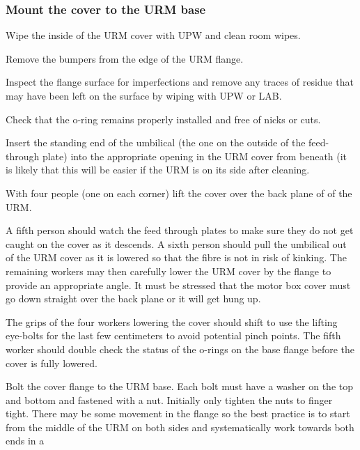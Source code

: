 \documentclass[11pt]{article}
\begin{document}
\subsubsection{Mount the cover to the URM base}
\begin{answerlist}
\item Wipe the inside of the URM cover with UPW and clean room wipes.
\item Remove the bumpers from the edge of the URM flange.
\item Inspect the flange surface for imperfections and remove any
  traces of residue that may have been left on the surface by wiping
  with UPW or LAB.
\item Check that the o-ring remains properly installed and free of
  nicks or cuts.
\item Insert the standing end of the umbilical (the one on the outside of the feed-through plate) into the appropriate opening in the URM cover from beneath (it is likely that this will be easier if the URM is on its side after cleaning. 
\item With four people (one on each corner) lift the cover over the
  back plane of of the URM.
\item A fifth person should watch the feed through plates to make sure
  they do not get caught on the cover as it descends. A sixth person
  should pull the umbilical out of the URM cover as it is lowered so
  that the fibre is not in risk of kinking. The remaining workers may
  then carefully lower the URM cover by the flange to provide an
  appropriate angle. It must be stressed that the motor box cover must
  go down straight over the back plane or it will get hung up.
\item The grips of the four workers lowering the cover should shift to
  use the lifting eye-bolts for the last few centimeters to avoid
  potential pinch points. The fifth worker should double check the
  status of the o-rings on the base flange before the cover is fully
  lowered.
\item Bolt the cover flange to the URM base. Each bolt must have a
  washer on the top and bottom and fastened with a nut. Initially only
  tighten the nuts to finger tight. There may be some movement in the
  flange so the best practice is to start from the middle of the URM
  on both sides and systematically work towards both ends in a

\end{answerlist}
\end{document}
